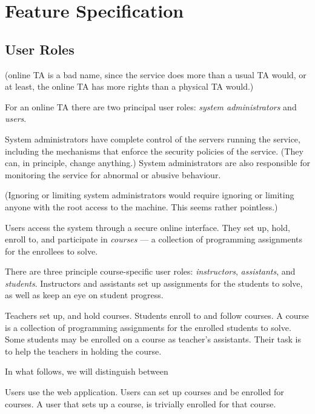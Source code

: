 
\chapter{Feature Specification}



\section{User Roles}

(online TA is a bad name, since the service does more than a usual TA would, or
at least, the online TA has more rights than a physical TA would.)

For an online TA there are two principal user roles: \emph{system
administrators} and \emph{users}.

System administrators have complete control of the servers running the service,
including the mechanisms that enforce the security policies of the service.
(They can, in principle, change anything.) System administrators are also
responsible for monitoring the service for abnormal or abusive behaviour.

(Ignoring or limiting system administrators would require ignoring or limiting
anyone with the root access to the machine. This seems rather pointless.)

Users access the system through a secure online interface. They set up, hold,
enroll to, and participate in \emph{courses} --- a collection of programming
assignments for the enrollees to solve.

There are three principle course-specific user roles: \emph{instructors},
\emph{assistants}, and \emph{students}. Instructors and assistants set up
assignments for the students to solve, as well as keep an eye on student
progress.

Teachers set up, and hold courses. Students enroll to and follow courses. A
course is a collection of programming assignments for the enrolled students to
solve. Some students may be enrolled on a course as teacher's assistants. Their
task is to help the teachers in holding the course.

In what follows, we will distinguish between 

Users use the web application. Users can set up courses and be enrolled for
courses. A user that sets up a course, is trivially enrolled for that course.

